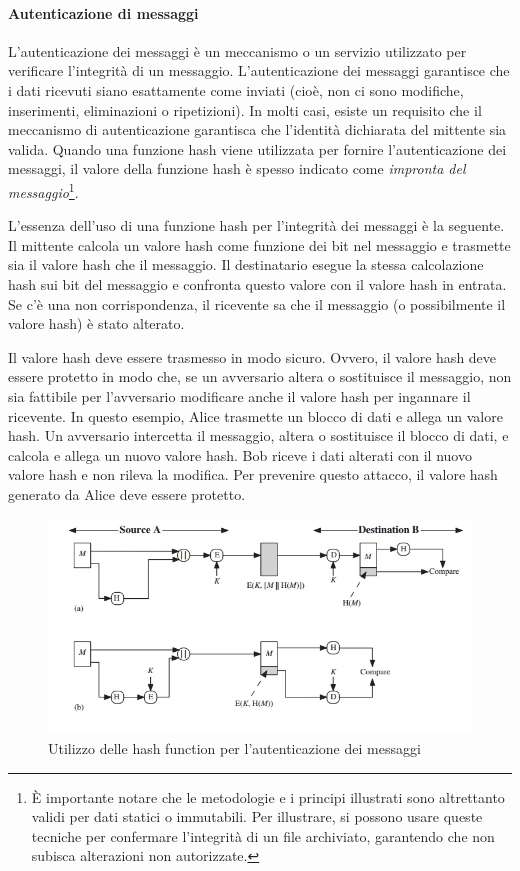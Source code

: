 \documentclass{article}
\theoremstyle{definition}
\begin{document}
\paragraph{Autenticazione di messaggi}
L'autenticazione dei messaggi è un meccanismo o un servizio utilizzato per verificare l'integrità di un messaggio. L'autenticazione dei messaggi garantisce che i dati ricevuti siano esattamente come inviati (cioè, non ci sono modifiche, inserimenti, eliminazioni o ripetizioni). In molti casi, esiste un requisito che il meccanismo di autenticazione garantisca che l'identità dichiarata del mittente sia valida. Quando una funzione hash viene utilizzata per fornire l'autenticazione dei messaggi, il valore della funzione hash è spesso indicato come \textit{impronta del messaggio}\footnote{È importante notare che le metodologie e i principi illustrati sono altrettanto validi per dati statici o immutabili. Per illustrare, si possono usare queste tecniche per confermare l'integrità di un file archiviato, garantendo che non subisca alterazioni non autorizzate.
}.

L'essenza dell'uso di una funzione hash per l'integrità dei messaggi è la seguente. Il mittente calcola un valore hash come funzione dei bit nel messaggio e trasmette sia il valore hash che il messaggio. Il destinatario esegue la stessa calcolazione hash sui bit del messaggio e confronta questo valore con il valore hash in entrata. Se c'è una non corrispondenza, il ricevente sa che il messaggio (o possibilmente il valore hash) è stato alterato.

Il valore hash deve essere trasmesso in modo sicuro. Ovvero, il valore hash deve essere protetto in modo che, se un avversario altera o sostituisce il messaggio, non sia fattibile per l'avversario modificare anche il valore hash per ingannare il ricevente. In questo esempio, Alice trasmette un blocco di dati e allega un valore hash. Un avversario intercetta il messaggio, altera o sostituisce il blocco di dati, e calcola e allega un nuovo valore hash. Bob riceve i dati alterati con il nuovo valore hash e non rileva la modifica. Per prevenire questo attacco, il valore hash generato da Alice deve essere protetto.

\begin{figure}[H]
    \centering
    \includegraphics[width=\textwidth]{img/alice.jpg}
    \caption{Utilizzo delle hash function per l'autenticazione dei messaggi}
    \label{fig:itm}
\end{figure}
\end{document}
